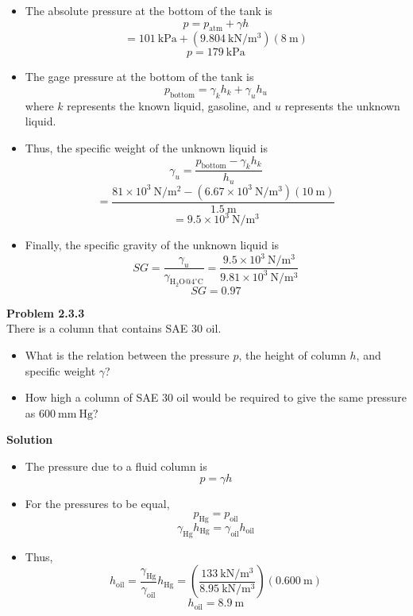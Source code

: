 ﻿\documentclass[12pt]{article}
\begin{document}
\begin{itemize}
\item[(a)] The absolute pressure at the bottom of the tank is
\[
p=p_{\mathrm{atm}}+\gamma h
\]
\[
=101\ \mathrm{kPa}+\left(9.804\ \mathrm{kN/m^3}\right)(8\ \mathrm{m})
\]
\[
\boxed{p=179\ \mathrm{kPa}}
\]
\item[(b)] The gage pressure at the bottom of the tank is
\[
p_{\mathrm{bottom}}=\gamma_k h_k+\gamma_u h_u
\]
where $k$ represents the known liquid, gasoline, and $u$ represents the unknown liquid.
\item Thus, the specific weight of the unknown liquid is
\[
\gamma_u=\frac{p_{\mathrm{bottom}}-\gamma_k h_k}{h_u}
\]
\[
=\frac{81\times10^3\ \mathrm{N/m^2}-\left(6.67\times10^3\ \mathrm{N/m^3}\right)(10\ \mathrm{m})}{1.5\ \mathrm{m}}
\]
\[
=9.5\times10^3\ \mathrm{N/m^3}
\]
\item Finally, the specific gravity of the unknown liquid is
\[
SG=\frac{\gamma_u}{\gamma_{\mathrm{H_2O}@4^\circ\mathrm{C}}}
=\frac{9.5\times10^3\ \mathrm{N/m^3}}{9.81\times10^3\ \mathrm{N/m^3}}
\]
\[
\boxed{SG=0.97}
\]
\end{itemize}
\newpage
\textbf{Problem 2.3.3}\\
There is a column that contains SAE 30 oil.
\begin{itemize}
\item[(a)] What is the relation between the pressure $p$, the height of column $h$, and specific weight $\gamma$?
\item[(b)] How high a column of SAE 30 oil would be required to give the same pressure as $600\ \mathrm{mm\ Hg}$?
\end{itemize}
\textbf{Solution}
\begin{itemize}
\item[(a)] The pressure due to a fluid column is
\[
\boxed{p=\gamma h}
\]
\item[(b)] For the pressures to be equal,
\[
p_{\mathrm{Hg}}=p_{\mathrm{oil}}
\]
\[
\gamma_{\mathrm{Hg}}h_{\mathrm{Hg}}=\gamma_{\mathrm{oil}}h_{\mathrm{oil}}
\]
\item Thus,
\[
h_{\mathrm{oil}}=\frac{\gamma_{\mathrm{Hg}}}{\gamma_{\mathrm{oil}}}h_{\mathrm{Hg}}
=\left(\frac{133\ \mathrm{kN/m^3}}{8.95\ \mathrm{kN/m^3}}\right)(0.600\ \mathrm{m})
\]
\[
\boxed{h_{\mathrm{oil}}=8.9\ \mathrm{m}}
\]
\end{itemize}
\end{document}
